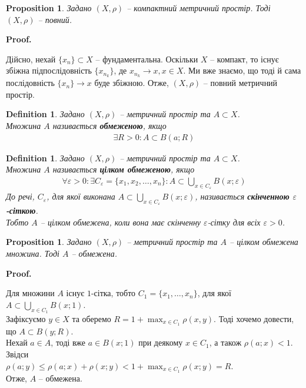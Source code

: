 \documentclass[a4paper, 10pt]{article}
\makeatletter
\theoremstyle{theoremdd}
\theoremstyle{theoremdd}
\newtheorem{definition}[theorem]{Definition}
\theoremstyle{theoremdd}
\theoremstyle{theoremdd}
\theoremstyle{theoremdd}
\newtheorem{proposition}[theorem]{Proposition}
\theoremstyle{theoremdd}
\theoremstyle{theoremdd}
\theoremstyle{theoremdd}
\renewenvironment{proof}[1][Proof.\\]{\par
\pushQED{\hfill \qed}%
\normalfont \topsep6\p@\@plus6\p@\relax
\trivlist
\item\relax
{\bfseries
#1\@addpunct{.}}\hspace\labelsep\ignorespaces
}{%
\popQED\endtrivlist\@endpefalse
}
\makeatother
\begin{document}
\begin{proposition}
Задано $(X,\rho)$ -- компактний метричний простір. Тоді $(X,\rho)$ -- повний.
\end{proposition}

\begin{proof}
Дійсно, нехай $\{x_n\} \subset X$ -- фундаментальна. Оскільки $X$ -- компакт, то існує збіжна підпослідовність $\{x_{n_k}\}$, де $x_{n_k} \to x, x \in X$. Ми вже знаємо, що тоді й сама послідовність $\{x_n\} \to x$ буде збіжною. Отже, $(X,\rho)$ -- повний метричний простір.
\end{proof}

\begin{definition}
Задано $(X,\rho)$ -- метричний простір та $A \subset X$.\\
Множина $A$ називається \textbf{обмеженою}, якщо
\begin{align*}
\exists R > 0: A \subset B(a;R)
\end{align*}
\end{definition}

\begin{definition}
Задано $(X,\rho)$ -- метричний простір та $A \subset X$.\\
Множина $A$ називається \textbf{цілком обмеженою}, якщо
\begin{align*}
\forall \varepsilon > 0: \exists C_\varepsilon = \{x_1,x_2,\dots,x_n\}: A \subset \displaystyle\bigcup_{x \in C_\varepsilon} B(x;\varepsilon)
\end{align*}
До речі, $C_\varepsilon$, для якої виконана $A \subset \displaystyle\bigcup_{x \in C_\varepsilon} B(x;\varepsilon)$, називається \textbf{скінченною $\varepsilon$-сіткою}.\\
Тобто $A$ -- цілком обмежена, коли вона має скінченну $\varepsilon$-сітку для всіх $\varepsilon > 0$.
\end{definition}

\begin{proposition}
Задано $(X,\rho)$ -- метричний простір та $A$ -- цілком обмежена множина. Тоді $A$ -- обмежена.
\end{proposition}

\begin{proof}
Для множини $A$ існує $1$-сітка, тобто $C_1 = \{x_1,\dots,x_n\}$, для якої $A \subset \displaystyle\bigcup_{x \in C_1} B(x;1)$.\\
Зафіксуємо $y \in X$ та оберемо $R = 1 +\displaystyle\max_{x \in C_1} \rho(x,y)$. Тоді хочемо довести, що $A \subset B(y;R)$.\\
Нехай $a \in A$, тоді вже $a \in B(x;1)$ при деякому $x \in C_1$, а також $\rho(a;x) < 1$. Звідси\\
$\rho(a;y) \leq \rho(a;x) + \rho(x;y) < 1 + \displaystyle\max_{x \in C_1} \rho(x;y) = R$.\\
Отже, $A$ -- обмежена.
\end{proof}
\end{document}

